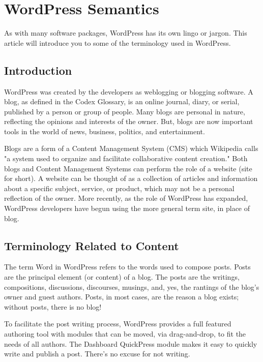 \section{WordPress Semantics}

As with many software packages, WordPress has its own lingo or jargon. This article will introduce you to some of the terminology used in WordPress.

\subsection{Introduction}

WordPress was created by the developers as weblogging or blogging software. A blog, as defined in the Codex Glossary, is an online journal, diary, or serial, published by a person or group of people. Many blogs are personal in nature, reflecting the opinions and interests of the owner. But, blogs are now important tools in the world of news, business, politics, and entertainment.

Blogs are a form of a Content Management System (CMS) which Wikipedia calls "a system used to organize and facilitate collaborative content creation." Both blogs and Content Management Systems can perform the role of a website (site for short). A website can be thought of as a collection of articles and information about a specific subject, service, or product, which may not be a personal reflection of the owner. More recently, as the role of WordPress has expanded, WordPress developers have begun using the more general term site, in place of blog.

\subsection{Terminology Related to Content}

The term Word in WordPress refers to the words used to compose posts. Posts are the principal element (or content) of a blog. The posts are the writings, compositions, discussions, discourses, musings, and, yes, the rantings of the blog's owner and guest authors. Posts, in most cases, are the reason a blog exists; without posts, there is no blog!

To facilitate the post writing process, WordPress provides a full featured authoring tool with modules that can be moved, via drag-and-drop, to fit the needs of all authors. The Dashboard QuickPress module makes it easy to quickly write and publish a post. There's no excuse for not writing.

